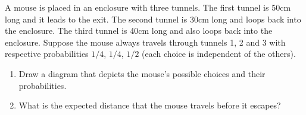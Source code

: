 \documentclass[12pt]{article}
\begin{document}
A mouse is placed in an enclosure with three tunnels.
	The first tunnel is 50cm long and it leads to the exit.
	The second tunnel is 30cm long and loops back into the enclosure.
	The third tunnel is 40cm long and also loops back into the enclosure.
	Suppose the mouse always travels through tunnels 1, 2 and 3 with respective probabilities $1/4$, $1/4$, $1/2$ (each choice is independent of the others).
\begin{enumerate}

	\item Draw a diagram that depicts the mouse's possible choices and their probabilities.

	\vfill

	\item What is the expected distance that the mouse travels before it escapes?

	\vfill\null
	\vfill\null
\end{enumerate}
\end{document}
